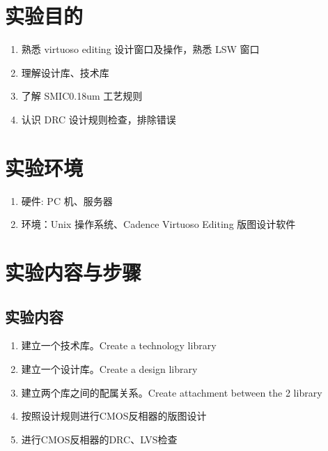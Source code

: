 \documentclass{theme-2614084}
\begin{document}

\makecover


\section{实验目的}

\begin{enumerate}
  \item 熟悉 virtuoso editing 设计窗口及操作，熟悉 LSW 窗口
  \item 理解设计库、技术库
  \item 了解 SMIC0.18um 工艺规则
  \item 认识 DRC 设计规则检查，排除错误
\end{enumerate}

\section{实验环境}

\begin{enumerate}
  \item 硬件: PC 机、服务器
  \item 环境：Unix 操作系统、Cadence Virtuoso Editing 版图设计软件
\end{enumerate}

\section{实验内容与步骤}


\subsection{实验内容}

\begin{enumerate}
  \item 建立一个技术库。Create a technology library
  \item 建立一个设计库。Create a design library
  \item 建立两个库之间的配属关系。Create attachment between the 2 library
  \item 按照设计规则进行CMOS反相器的版图设计
  \item 进行CMOS反相器的DRC、LVS检查
\end{enumerate}
\end{document}
